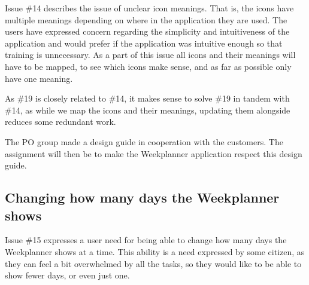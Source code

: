 Issue \#14 describes the issue of unclear icon meanings. That is, the icons have multiple meanings depending on where in the application they are used. The users have expressed concern regarding the simplicity and intuitiveness of the application and would prefer if the application was intuitive enough so that training is unnecessary. As a part of this issue all icons and their meanings will have to be mapped, to see which icons make sense, and as far as possible only have one meaning. 

As \#19 is closely related to \#14, it makes sense to solve \#19 in tandem with \#14, as while we map the icons and their meanings, updating them alongside reduces some redundant work.

The \gls{PO} group made a design guide in cooperation with the customers. The assignment will then be to make the Weekplanner application respect this design guide.

\subsection{Changing how many days the Weekplanner shows} \label{sec:weekPlannerDaysToShow}

Issue \#15 expresses a user need for being able to change how many days the Weekplanner shows at a time. This ability is a need expressed by some citizen, as they can feel a bit overwhelmed by all the tasks, so they would like to be able to show fewer days, or even just one.